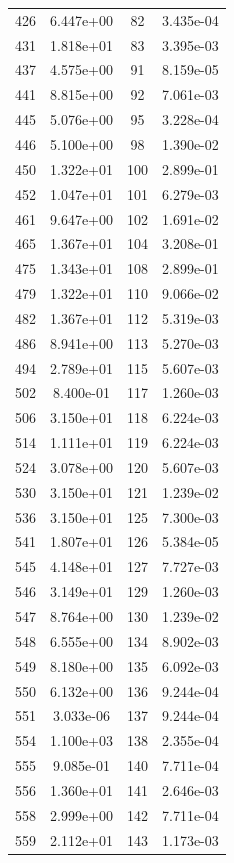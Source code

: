 \documentclass[12pt]{article}
\begin{document}
\begin{longtable}{@{}cccc@{}}
426 & 6.447e+00 & 82 & 3.435e-04 \\
431 & 1.818e+01 & 83 & 3.395e-03 \\
437 & 4.575e+00 & 91 & 8.159e-05 \\
441 & 8.815e+00 & 92 & 7.061e-03 \\
445 & 5.076e+00 & 95 & 3.228e-04 \\
446 & 5.100e+00 & 98 & 1.390e-02 \\
450 & 1.322e+01 & 100 & 2.899e-01 \\
452 & 1.047e+01 & 101 & 6.279e-03 \\
461 & 9.647e+00 & 102 & 1.691e-02 \\
465 & 1.367e+01 & 104 & 3.208e-01 \\
475 & 1.343e+01 & 108 & 2.899e-01 \\
479 & 1.322e+01 & 110 & 9.066e-02 \\
482 & 1.367e+01 & 112 & 5.319e-03 \\
486 & 8.941e+00 & 113 & 5.270e-03 \\
494 & 2.789e+01 & 115 & 5.607e-03 \\
502 & 8.400e-01 & 117 & 1.260e-03 \\
506 & 3.150e+01 & 118 & 6.224e-03 \\
514 & 1.111e+01 & 119 & 6.224e-03 \\
524 & 3.078e+00 & 120 & 5.607e-03 \\
530 & 3.150e+01 & 121 & 1.239e-02 \\
536 & 3.150e+01 & 125 & 7.300e-03 \\
541 & 1.807e+01 & 126 & 5.384e-05 \\
545 & 4.148e+01 & 127 & 7.727e-03 \\
546 & 3.149e+01 & 129 & 1.260e-03 \\
547 & 8.764e+00 & 130 & 1.239e-02 \\
548 & 6.555e+00 & 134 & 8.902e-03 \\
549 & 8.180e+00 & 135 & 6.092e-03 \\
550 & 6.132e+00 & 136 & 9.244e-04 \\
551 & 3.033e-06 & 137 & 9.244e-04 \\
554 & 1.100e+03 & 138 & 2.355e-04 \\
555 & 9.085e-01 & 140 & 7.711e-04 \\
556 & 1.360e+01 & 141 & 2.646e-03 \\
558 & 2.999e+00 & 142 & 7.711e-04 \\
559 & 2.112e+01 & 143 & 1.173e-03 \\

\end{longtable}
\end{document}
